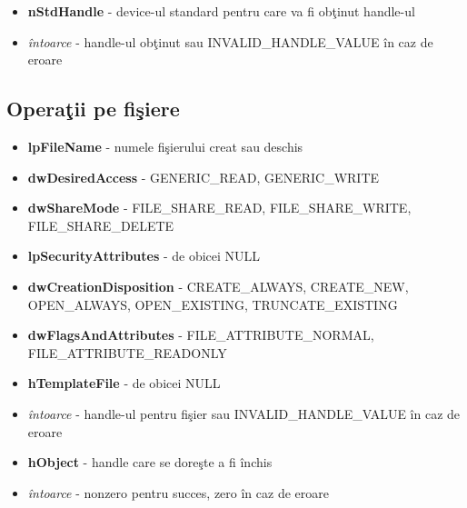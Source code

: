 \documentclass{refcard.cs.pub.ro}
\begin{document}
\begin{multicols*}{3}
\begin{itemize} 
\item \textbf{nStdHandle} - device-ul standard pentru care va fi obţinut handle-ul
\item \textit{întoarce} - handle-ul obţinut sau INVALID_HANDLE_VALUE în caz de eroare
\end{itemize}

\subsection{Operaţii pe fişiere}


\begin{itemize}
\item \textbf{lpFileName} - numele fişierului creat sau deschis
\item \textbf{dwDesiredAccess} - GENERIC_READ, GENERIC_WRITE
\item \textbf{dwShareMode} - FILE_SHARE_READ, FILE_SHARE_WRITE, FILE_SHARE_DELETE
\item \textbf{lpSecurityAttributes} - de obicei NULL
\item \textbf{dwCreationDisposition} - CREATE_ALWAYS, CREATE_NEW, OPEN_ALWAYS, OPEN_EXISTING, TRUNCATE_EXISTING
\item \textbf{dwFlagsAndAttributes} - FILE_ATTRIBUTE_NORMAL, FILE_ATTRIBUTE_READONLY
\item \textbf{hTemplateFile} - de obicei NULL
\item \textit{întoarce} - handle-ul pentru fişier sau INVALID_HANDLE_VALUE în caz de eroare
\end{itemize}

\begin{itemize}
\item \textbf{hObject} - handle care se doreşte a fi închis
\item \textit{întoarce} - nonzero pentru succes, zero în caz de eroare
\end{itemize}


\end{multicols*}
\end{document}
